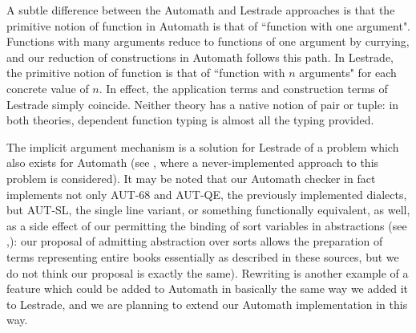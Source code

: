 \documentclass[submission,copyright,creativecommons]{eptcs}
\begin{document}
A subtle difference between the Automath and Lestrade approaches is that the primitive notion of function in Automath is that of ``function with one argument".  Functions with many arguments reduce to functions of one argument by currying, and our reduction of constructions in Automath follows this path.  In Lestrade, the primitive notion of function is that of ``function with $n$ arguments" for each concrete value of $n$.  In effect, the application terms and construction terms of Lestrade simply coincide.  Neither theory has a native notion
of pair or tuple:  in both theories, dependent function typing is almost all the typing provided.

The implicit argument mechanism is a solution for Lestrade of a problem which also exists for Automath (see \cite{autsynt}, where a never-implemented approach to this problem is considered).  It may be noted that our Automath checker in fact implements not only AUT-68 and AUT-QE, the previously implemented dialects, but AUT-SL, the single line variant, or something functionally equivalent, as well, as a side effect of our permitting the binding of sort variables in abstractions (see \cite{autsl},\cite{autlambda}):   our proposal of admitting abstraction over sorts allows the preparation of terms representing entire books essentially as described in these sources, but we do not think our proposal is exactly the same).  Rewriting is another example of a feature which could be added to Automath in basically the same way we added it to Lestrade, and we are planning to extend our Automath implementation in this way.

\begingroup
{}


\endgroup

%
\end{document}
